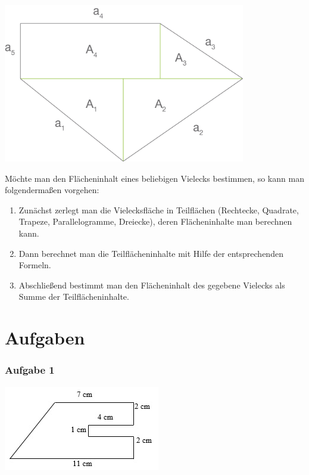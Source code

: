 \documentclass[
  ngerman,
]{book}
\providecommand{\tightlist}{%
  \setlength{\itemsep}{0pt}\setlength{\parskip}{0pt}}
\begin{document}
\includegraphics[width=4.16667in,height=\textheight]{./Bilder/VieleckZerlegen.png}

Möchte man den Flächeninhalt eines beliebigen Vielecks bestimmen, so kann man folgendermaßen vorgehen:

\begin{enumerate}
\def\labelenumi{\arabic{enumi}.}
\tightlist
\item
  Zunächst zerlegt man die Vielecksfläche in Teilflächen (Rechtecke, Quadrate, Trapeze, Parallelogramme, Dreiecke), deren Flächeninhalte man berechnen kann.
\item
  Dann berechnet man die Teilflächeninhalte mit Hilfe der entsprechenden Formeln.
\item
  Abschließend bestimmt man den Flächeninhalt des gegebene Vielecks als Summe der Teilflächeninhalte.
\end{enumerate}

\hypertarget{aufgaben-4}{%
\section*{Aufgaben}\label{aufgaben-4}}

\hypertarget{aufgabe-1-4}{%
\subsubsection*{Aufgabe 1}\label{aufgabe-1-4}}

\includegraphics{./Bilder/VieleckA1.jpg}
\end{document}
